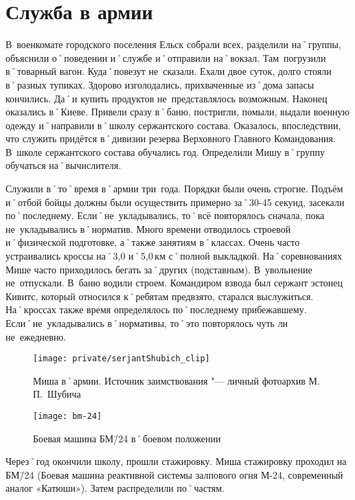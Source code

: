 ﻿\chapter{Служба в армии}
В~военкомате городского поселения Ельск собрали всех, разделили на˚группы, объяснили о˚поведении и˚службе и˚отправили на˚вокзал. Там~погрузили в˚товарный вагон. Куда˚повезут не~сказали. Ехали двое суток, долго стояли в˚разных тупиках. Здорово изголодались, прихваченные из˚дома запасы кончились. Да˚и купить продуктов не~представлялось возможным. Наконец оказались в˚Киеве. Привели сразу в˚баню, постригли, помыли, выдали военную одежду и˚направили в˚школу сержантского состава. Оказалось, впоследствии, что служить придётся в˚дивизии резерва Верховного Главного Командования. В~школе сержантского состава обучались год. Определили Мишу в˚группу обучаться на˚вычислителя.

Служили в˚то˚время в˚армии три~года. Порядки были очень строгие. Подъём и˚отбой бойцы должны были осуществить примерно за˚30-45 секунд, засекали по˚последнему. Если˚не~укладывались, то˚всё повторялось сначала, пока не~укладывались в˚норматив. Много времени отводилось строевой и˚физической подготовке, а˚также занятиям в˚классах. Очень часто устраивались кроссы на˚3,0 и˚5,0\,км с˚полной выкладкой. На˚соревнованиях Мише часто приходилось бегать за˚других (подставным). В~увольнение не~отпускали. В~баню водили строем. Командиром взвода был сержант эстонец Кивитс, который относился к˚ребятам предвзято, старался выслужиться. На˚кроссах также время определялось по˚последнему прибежавшему. Если˚не~укладывались в˚нормативы, то˚это повторялось чуть ли не~ежедневно.


\begin{figure}[H]
\texttt{[image: private/serjantShubich\_clip]}
\caption{Миша в˚армии. Источник заимствования "--- личный фотоархив М.\,П.~Шубича}
\label{fig:serjantShubich}
\end{figure}


\begin{wrapfigure}{O}{.4\textwidth}
\centering
\texttt{[image: bm-24]}
\caption[Боевая машина БМ\=/24 в˚боевом положении]{Боевая машина БМ\=/24 в˚боевом положении\footnotemark}
\label{fig:bm-24}
\end{wrapfigure}

Через˚год окончили школу, прошли стажировку. Миша стажировку проходил на БМ\=/24 (Боевая машина реактивной системы залпового огня М-24, современный аналог «Катюши»). Затем распределили по˚частям. 

